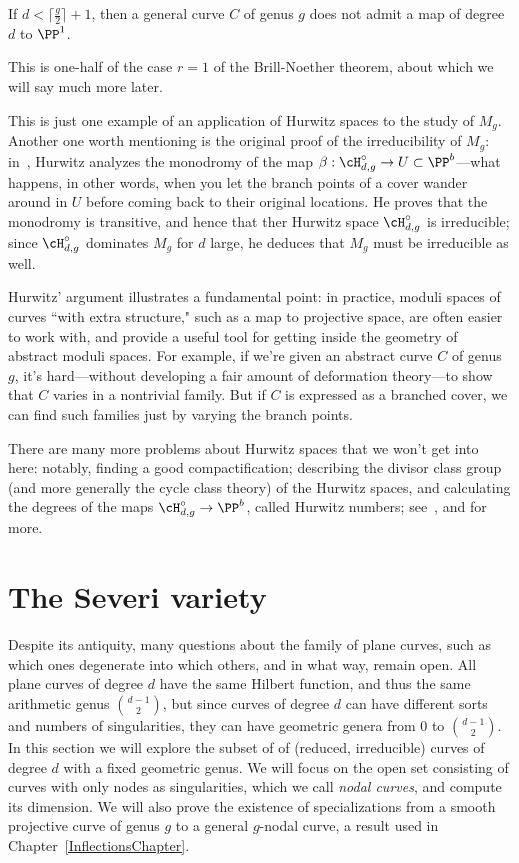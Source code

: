 \begin{corollary}
If $d < \lceil \frac{g}{2} \rceil + 1$, then a general curve $C$ of genus $g$ does not admit a map of degree $d$ to $\PP^1$.
\end{corollary}

This is one-half of the case $r=1$ of the Brill-Noether theorem, about which we will say much more later.

This is just one example of an application of Hurwitz spaces to the study of $M_g$. Another one worth mentioning is the original proof of the irreducibility of $M_g$: in~\cite{}, Hurwitz analyzes the monodromy of the map $\beta: \cH^\circ_{d,g} \to U \subset \PP^b$---what happens, in other words, when you let the branch points of a cover wander around in $U$ before coming back to their original locations. He proves that the monodromy is transitive, and hence that ther Hurwitz space $\cH^\circ_{d,g}$ is irreducible; since $\cH^\circ_{d,g}$ dominates $M_g$ for $d$ large, he deduces that $M_g$ must be irreducible as well.

Hurwitz' argument illustrates a fundamental point: in practice, moduli spaces of curves ``with extra structure," such as a map to projective space, are often easier to work with, and provide a useful tool for getting inside the geometry of abstract moduli spaces. For example, if we're given an abstract curve $C$ of genus $g$, it's hard---without developing a fair amount of deformation theory---to show that $C$ varies in a nontrivial family. But if $C$ is expressed as a branched cover, we can find such families just by varying the branch points.

There are many more problems about Hurwitz spaces that we won't get into here: notably, finding a good compactification; describing the divisor class group (and more generally the cycle class theory) of the Hurwitz spaces, and calculating the degrees of the maps $\cH^\circ_{d,g} \to \PP^b$, called Hurwitz numbers; see~\cite{}, \cite{} and \cite{} for more.

\section{The Severi variety}\label{severi variety}

Despite its antiquity, many questions about the family of plane curves, such as which ones degenerate into which others, and in what way, remain open. All plane curves of degree $d$ have the same Hilbert function, and thus the same arithmetic genus
$\binom{d-1}{2}$, but since curves of degree $d$ can have different sorts and numbers of singularities, they can have geometric genera from 0 to $\binom{d-1}{2}$. In this section we will explore the subset of of (reduced, irreducible) curves of degree $d$ with a fixed geometric genus. We will focus on the open set consisting of curves with only nodes as singularities, which we call \emph{nodal curves}, and compute its dimension. We will also prove the existence of specializations from a smooth projective curve of genus $g$ to a general $g$-nodal curve, a result used in Chapter~\ref{InflectionsChapter}.

